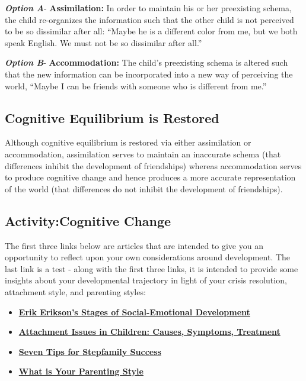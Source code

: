 \documentclass[
]{book}
\providecommand{\tightlist}{%
  \setlength{\itemsep}{0pt}\setlength{\parskip}{0pt}}
\begin{document}
\textbf{\emph{Option A}}- \textbf{Assimilation:} In order to maintain his or her preexisting schema, the child re-organizes the information such that the other child is not perceived to be so dissimilar after all: ``Maybe he is a different color from me, but we both speak English. We must not be so dissimilar after all.''

\textbf{\emph{Option B}}- \textbf{Accommodation:} The child's preexisting schema is altered such that the new information can be incorporated into a new way of perceiving the world, ``Maybe I can be friends with someone who is different from me.''

\hypertarget{cognitive-equilibrium-is-restored}{%
\subsection*{Cognitive Equilibrium is Restored}\label{cognitive-equilibrium-is-restored}}

Although cognitive equilibrium is restored via either assimilation or accommodation, assimilation serves to maintain an inaccurate schema (that differences inhibit the development of friendships) whereas accommodation serves to produce cognitive change and hence produces a more accurate representation of the world (that differences do not inhibit the development of friendships).

\hypertarget{activitycognitive-change}{%
\subsection*{Activity:Cognitive Change}\label{activitycognitive-change}}

\begin{reflect}
The first three links below are articles that are intended to give you an opportunity to reflect upon your own considerations around development. The last link is a test - along with the first three links, it is intended to provide some insights about your developmental trajectory in light of your crisis resolution, attachment style, and parenting styles:

\begin{itemize}
\tightlist
\item
  \href{http://www.childdevelopmentinfo.com/development/erickson.shtml}{\textbf{Erik Erikson's Stages of Social-Emotional Development}}\\
\item
  \href{https://www.helpguide.org/articles/childhood-issues/attachment-issues-in-children.htm}{\textbf{Attachment Issues in Children: Causes, Symptoms, Treatment}}\\
\item
  \href{https://www.gottman.com/blog/seven-tips-for-stepfamily-success/}{\textbf{Seven Tips for Stepfamily Success}}
\item
  \href{https://www.3smartcubes.com/pages/tests/parentingstyle/parentingstyle_instructions/}{\textbf{What is Your Parenting Style}}
\end{itemize}
\end{reflect}
\end{document}
